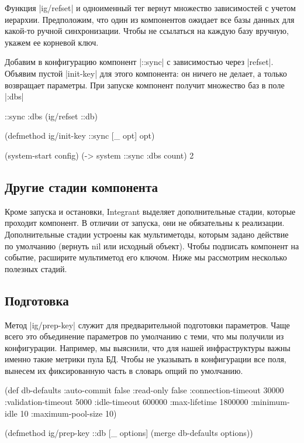 Функция \spverb|ig/refset| и одноименный тег вернут множество зависимостей с учетом
иерархии. Предположим, что один из компонентов ожидает все базы данных для
какой-то ручной синхронизации. Чтобы не ссылаться на каждую базу вручную, укажем
ее корневой ключ.

Добавим в конфигурацию компонент \spverb|::sync| с зависимостью через \spverb|refset|. Объявим
пустой \spverb|init-key| для этого компонента: он ничего не делает, а только возвращает
параметры. При запуске компонент получит множество баз в поле \spverb|:dbs|

\begin{code}
{::sync {:dbs (ig/refset ::db)}}

(defmethod ig/init-key ::sync
  [_ opt] opt)

(system-start config)
(-> system ::sync :dbs count)
2
\end{code}

\subsection{Другие стадии компонента}

Кроме запуска и остановки, Integrant выделяет дополнительные стадии, которые
проходит компонент. В отличии от запуска, они не обязательны к
реализации. Дополнительные стадии устроены как мультиметоды, которым задано
действие по умолчанию (вернуть nil или исходный объект). Чтобы подписать
компонент на событие, расширите мультиметод его ключом. Ниже мы рассмотрим
несколько полезных стадий.

\subsection{Подготовка}

Метод \spverb|ig/prep-key| служит для предварительной подготовки параметров. Чаще всего
это объединение параметров по умолчанию с теми, что мы получили из
конфигурации. Например, мы выяснили, что для нашей инфраструктуры важны именно
такие метрики пула БД. Чтобы не указывать в конфигурации все поля, вынесем их
фиксированную часть в словарь опций по умолчанию.

\begin{code}
(def db-defaults
  {:auto-commit        false
   :read-only          false
   :connection-timeout 30000
   :validation-timeout 5000
   :idle-timeout       600000
   :max-lifetime       1800000
   :minimum-idle       10
   :maximum-pool-size  10})

(defmethod ig/prep-key ::db
  [_ options]
  (merge db-defaults options))
\end{code}

